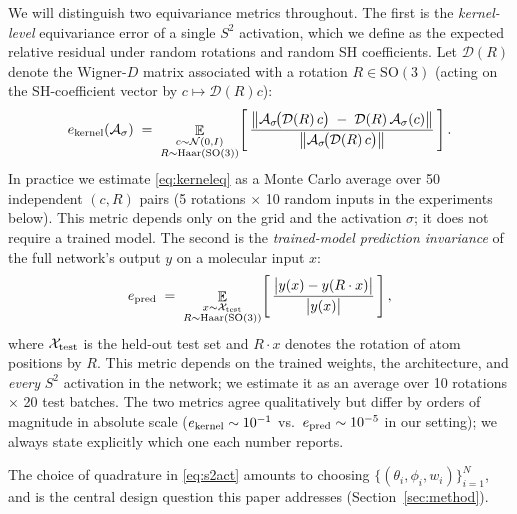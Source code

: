\documentclass{article}
\begin{document}
We will distinguish two equivariance metrics throughout. The first is
the \emph{kernel-level} equivariance error of a single $S^2$
activation, which we define as the expected relative residual under
random rotations and random SH coefficients. Let $\mathcal{D}(R)$
denote the Wigner-$D$ matrix associated with a rotation
$R \in \mathrm{SO}(3)$ (acting on the SH-coefficient vector by
$c \mapsto \mathcal{D}(R) c$):
\begin{equation}
  e_{\rm kernel}(\mathcal{A}_\sigma)
  \;=\;
  \mathop{\mathbb{E}}_{\substack{c \sim \mathcal{N}(0, I) \\
                                 R \sim \mathrm{Haar}(\mathrm{SO}(3))}}
  \!\left[\,
  \frac{\bigl\| \mathcal{A}_\sigma\!\bigl(\mathcal{D}(R)\,c\bigr)
              \;-\; \mathcal{D}(R)\, \mathcal{A}_\sigma(c) \bigr\|}
       {\bigl\| \mathcal{A}_\sigma\!\bigl(\mathcal{D}(R)\,c\bigr) \bigr\|}
  \,\right].
  \label{eq:kerneleq}
\end{equation}
In practice we estimate \eqref{eq:kerneleq} as a Monte Carlo average
over 50 independent $(c, R)$ pairs (5 rotations $\times$ 10 random
inputs in the experiments below). This metric depends only on the
grid and the activation $\sigma$; it does not require a trained
model. The second is the \emph{trained-model prediction invariance}
of the full network's output $y$ on a molecular input $x$:
\begin{equation}
  e_{\rm pred}
  \;=\;
  \mathop{\mathbb{E}}_{\substack{x \sim \mathcal{X}_{\rm test} \\
                                 R \sim \mathrm{Haar}(\mathrm{SO}(3))}}
  \!\left[\,
  \frac{\bigl| y(x) - y(R \cdot x) \bigr|}
       {\bigl| y(x) \bigr|}
  \,\right],
  \label{eq:predeq}
\end{equation}
where $\mathcal{X}_{\rm test}$ is the held-out test set and
$R \cdot x$ denotes the rotation of atom positions by $R$. This
metric depends on the trained weights, the architecture, and
\emph{every} $S^2$ activation in the network; we estimate it as an
average over 10 rotations $\times$ 20 test batches. The two metrics
agree qualitatively but differ by orders of magnitude in absolute
scale ($e_{\rm kernel} \sim 10^{-1}$ vs.\ $e_{\rm pred} \sim 10^{-5}$
in our setting); we always state explicitly which one each number
reports.

The choice of quadrature in \eqref{eq:s2act} amounts to choosing
$\{(\theta_i, \phi_i, w_i)\}_{i=1}^N$, and is the central design
question this paper addresses (Section~\ref{sec:method}).
\end{document}
